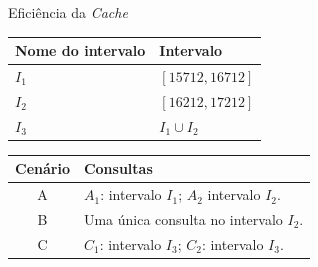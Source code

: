 \begin{frame}{Eficiência da \textit{Cache}}
    \begin{table}[htb]
        \small
        \begin{tabular}{ll}
            \toprule
            Nome do intervalo & Intervalo \\
            \midrule
            $I_1$ & $[15712, 16712]$ \\
            $I_2$ & $[16212, 17212]$ \\
            $I_3$ & $I_1 \cup I_2$ \\
            \bottomrule
        \end{tabular}
        \begin{tabular}{cp{}}
            \toprule
            Cenário & Consultas \\
            \midrule
            A
            &
            $A_1$: intervalo $I_1$; $A_2$ intervalo $I_2$.
            \\
            B & Uma única consulta no intervalo $I_2$.
            \\
            C
            &
            $C_1$: intervalo $I_3$; $C_2$: intervalo $I_3$.
            \\
            \bottomrule
        \end{tabular}
    \end{table}
\end{frame}


